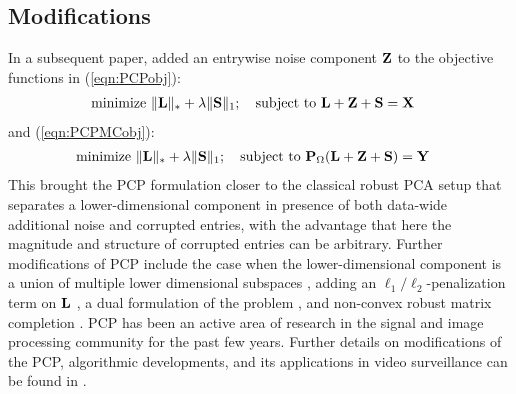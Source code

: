 \subsection*{\sffamily \large Modifications}
In a subsequent paper, \cite{ZhouEtal10} added an entrywise noise component ${\mathbf{Z}}$ to the objective functions in (\ref{eqn:PCPobj}):
%
\begin{align}\label{eqn:PCPobjZ}
& \text{minimize } \| {\mathbf{L}} \|_* + \lambda \| {\mathbf{S}} \|_1; \quad \text{subject to } {\mathbf{L}} + {\mathbf{Z}} + {\mathbf{S}} = {\mathbf{X}}
\end{align}
%
and (\ref{eqn:PCPMCobj}):
%
\begin{align}\label{eqn:PCPMCobjZ}
& \text{minimize } \| {\mathbf{L}} \|_* + \lambda \| {\mathbf{S}} \|_1; \quad \text{subject to } {\mathbf{P}}_\Omega({\mathbf{L}} + {\mathbf{Z}} + {\mathbf{S}}) = {\mathbf{Y}}
\end{align}
%
This brought the PCP formulation closer to the classical robust PCA setup that separates a lower-dimensional component in presence of both data-wide additional noise and corrupted entries, with the advantage that here the magnitude and structure of corrupted entries can be arbitrary. Further modifications of PCP include the case when the lower-dimensional component is a union of multiple lower dimensional subspaces \citep{WohlbergEtal12}, adding an $\ell_1/\ell_2$-penalization term on ${\mathbf{L}}$ \citep{TangNehorai11}, a dual formulation of the problem \citep{BeckerEtal11}, and non-convex robust matrix completion \citep{ShangEtal14}. PCP has been an active area of research in the signal and image processing community for the past few years. Further details on modifications of the PCP, algorithmic developments, and its applications in video surveillance can be found in \cite{Bouwmans14}.